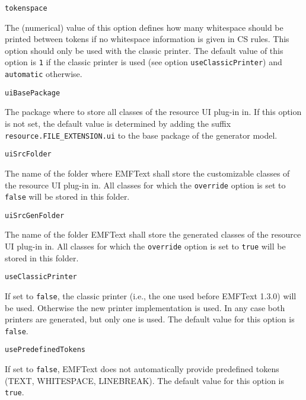 \noindent\texttt{tokenspace}
\begin{myindentpar}{1cm}
The (numerical) value of this option defines how many whitespace should be printed between tokens if no whitespace information is given in CS rules. This option should only be used with the classic printer. The default value of this option is \texttt{1} if the classic printer is used (see option \texttt{useClassicPrinter}) and \texttt{automatic} otherwise.
\end{myindentpar}

\noindent\texttt{uiBasePackage}
\begin{myindentpar}{1cm}
The package where to store all classes of the resource UI plug-in in. If this option is not set, the default value is determined by adding the suffix \texttt{resource.FILE\_EXTENSION.ui} to the base package of the generator model.
\end{myindentpar}

\noindent\texttt{uiSrcFolder}
\begin{myindentpar}{1cm}
The name of the folder where EMFText shall store the customizable classes of the resource UI plug-in in. All classes for which the \texttt{override} option is set to \texttt{false} will be stored in this folder.
\end{myindentpar}

\noindent\texttt{uiSrcGenFolder}
\begin{myindentpar}{1cm}
The name of the folder EMFText shall store the generated classes of the resource UI plug-in in. All classes for which the \texttt{override} option is set to \texttt{true} will be stored in this folder.
\end{myindentpar}

\noindent\texttt{useClassicPrinter}
\begin{myindentpar}{1cm}
If set to \texttt{false}, the classic printer (i.e., the one used before EMFText 1.3.0) will be used. Otherwise the new printer implementation is used. In any case both printers are generated, but only one is used. The default value for this option is \texttt{false}.
\end{myindentpar}

\noindent\texttt{usePredefinedTokens}
\begin{myindentpar}{1cm}
If set to \texttt{false}, EMFText does not automatically provide predefined tokens (TEXT, WHITESPACE, LINEBREAK). The default value for this option is \texttt{true}.
\end{myindentpar}

